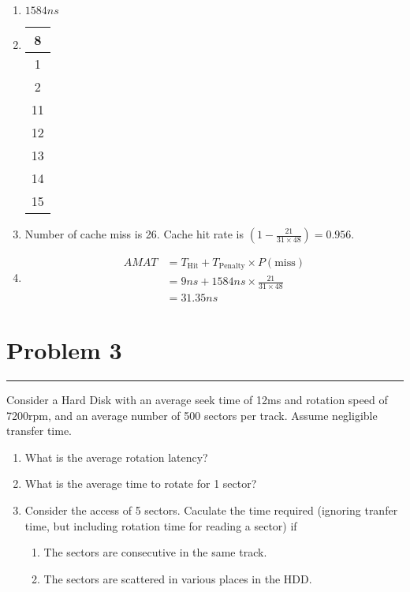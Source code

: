 \documentclass{article}
\begin{document}
\begin{enumerate}[label=(\alph*)]
    \item $1584ns$
    \item \begin{tabular}{|c|}
              \hline
              8  \\
              \hline
              1  \\
              \hline
              2  \\
              \hline
              11 \\
              \hline
              12 \\
              \hline
              13 \\
              \hline
              14 \\
              \hline
              15 \\
              \hline
          \end{tabular}
    \item Number of cache miss is 26. Cache hit rate is $(1-\frac{21}{31\times 48}) = 0.956$.
    \item \begin{align*}
              AMAT & = T_\text{Hit} + T_\text{Penalty} \times P(\text{miss}) \\
                   & = 9ns + 1584ns \times \frac{21}{31 \times 48}           \\
                   & =31.35ns
          \end{align*}
\end{enumerate}

\section*{Problem 3}
\hrule
\vspace{0.5cm}

Consider a Hard Disk with an average seek time of 12ms and rotation speed of 7200rpm, and an average number of 500 sectors per track. Assume negligible transfer time.
\begin{enumerate}[label=(\alph*)]
    \item What is the average rotation latency?
    \item What is the average time to rotate for 1 sector?
    \item Consider the access of 5 sectors. Caculate the time required (ignoring tranfer time, but including rotation time for reading a sector) if
          \begin{enumerate}[label=(\roman*)]
              \item The sectors are consecutive in the same track.
              \item The sectors are scattered in various places in the HDD.
          \end{enumerate}
\end{enumerate}
\end{document}
